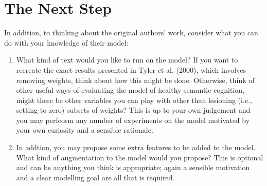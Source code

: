 \documentclass[a4paper,10pt]{article}
\begin{document}
\section{The Next Step}
In addition, to thinking about the original authors' work, consider what you can do with your knowledge of their model: 
\begin{enumerate}


 \item What kind of text would you like to run on the model? If you want to recreate the exact results presented in Tyler et al. (2000), which involves removing weights, think about how this might be done. Otherwise, think of other useful ways of evaluating the model of healthy semantic cognition, might there be other variables you can play with other than lesioning (i.e., setting to zero) subsets of weights? This is up to your own judgement and you may perfeorm any number of  experiments on the model motivated by your own curiosity and a sensible rationale. 
 
\item In addtion, you may propose some extra features to be added to the model. What kind of augmentation to the model would you propose? This is optional and can be anything you think is appropriate; again a sensible motivation and a clear modelling goal are all that is required.
\end{enumerate}
\end{document}
